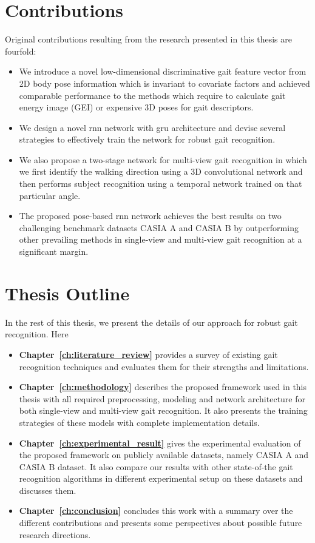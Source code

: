 \section{Contributions}
Original contributions resulting from the research presented in this thesis are fourfold:
\begin{itemize}
\item We introduce a novel low-dimensional discriminative gait feature vector from 2D body pose information which is invariant to covariate factors and achieved comparable performance to the methods which require to calculate gait energy image (GEI) or expensive 3D poses for gait descriptors.

\item We design a novel \gls{rnn} network with \gls{gru} architecture and devise several strategies to effectively train the network for robust gait recognition. 

\item We also propose a two-stage network for multi-view gait recognition in which we first identify the walking direction using a 3D convolutional network and then performs subject recognition using a temporal network trained on that particular angle.

\item The proposed pose-based \gls{rnn} network achieves the best results on two challenging benchmark datasets CASIA A and CASIA B by outperforming other prevailing methods in single-view and multi-view gait recognition at a significant margin.
\end{itemize}


\section{Thesis Outline} 
In the rest of this thesis, we present the details of our approach for robust gait recognition. Here
\begin{itemize}
\item \textbf{Chapter~\ref{ch:literature_review}} provides a survey of existing gait recognition techniques and evaluates them for their strengths and limitations.
\item \textbf{Chapter~\ref{ch:methodology}} describes the proposed framework used in this thesis with all required preprocessing, modeling and network architecture for both single-view and multi-view gait recognition. It also presents the training strategies of these models with complete implementation details.

\item \textbf{Chapter~\ref{ch:experimental_result}} gives the experimental evaluation of the proposed framework on publicly available datasets, namely CASIA A and CASIA B dataset. It also compare our results with other state-of-the gait recognition algorithms in different experimental setup on these datasets and discusses them. 

\item \textbf{Chapter~\ref{ch:conclusion}} concludes this work with a summary over the different contributions and presents some perspectives about possible future research directions.
\end{itemize}


